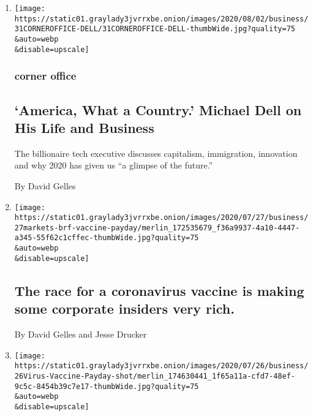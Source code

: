 \begin{enumerate}
\def\labelenumi{\arabic{enumi}.}
\item
  \href{/2020/07/31/business/michael-dell-corner-office.html}{}

  \texttt{[image: https://static01.graylady3jvrrxbe.onion/images/2020/08/02/business/31CORNEROFFICE-DELL/31CORNEROFFICE-DELL-thumbWide.jpg?quality=75\\\&auto=webp\\\&disable=upscale]}

  \hypertarget{corner-office}{%
  \subsubsection{corner office}\label{corner-office}}

  \hypertarget{america-what-a-country-michael-dell-on-his-life-and-business}{%
  \subsection{`America, What a Country.' Michael Dell on His Life and
  Business}\label{america-what-a-country-michael-dell-on-his-life-and-business}}

  The billionaire tech executive discusses capitalism, immigration,
  innovation and why 2020 has given us ``a glimpse of the future.''

  By David Gelles
\item
  \href{/2020/07/27/business/the-race-for-a-coronavirus-vaccine-is-making-some-corporate-insiders-very-rich.html}{}

  \texttt{[image: https://static01.graylady3jvrrxbe.onion/images/2020/07/27/business/27markets-brf-vaccine-payday/merlin\_172535679\_f36a9937-4a10-4447-a345-55f62c1cffec-thumbWide.jpg?quality=75\\\&auto=webp\\\&disable=upscale]}

  \hypertarget{the-race-for-a-coronavirus-vaccine-is-making-some-corporate-insiders-very-rich}{%
  \subsection{The race for a coronavirus vaccine is making some
  corporate insiders very
  rich.}\label{the-race-for-a-coronavirus-vaccine-is-making-some-corporate-insiders-very-rich}}

  By David Gelles and Jesse Drucker
\item
  \href{/2020/07/25/business/coronavirus-vaccine-profits-vaxart.html}{}

  \texttt{[image: https://static01.graylady3jvrrxbe.onion/images/2020/07/26/business/26Virus-Vaccine-Payday-shot/merlin\_174630441\_1f65a11a-cfd7-48ef-9c5c-8454b39c7e17-thumbWide.jpg?quality=75\\\&auto=webp\\\&disable=upscale]}


\end{enumerate}
